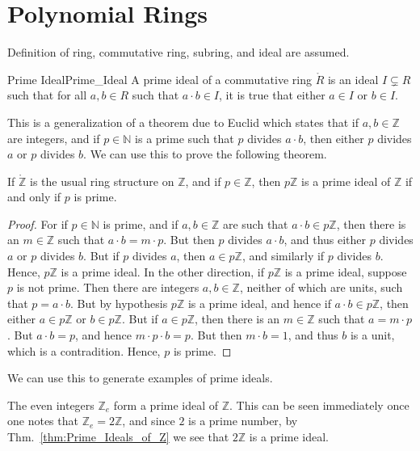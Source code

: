 \section{Polynomial Rings}
    Definition of ring, commutative ring, subring, and ideal are assumed.
    \begin{fdefinition}{Prime Ideal}{Prime_Ideal}
        A prime ideal of a commutative ring $\ring{R}$ is an ideal
        $I\subsetneq{R}$ such that for all $a,b\in{R}$ such that
        $a\cdot{b}\in{I}$, it is true that either $a\in{I}$ or $b\in{I}$.
    \end{fdefinition}
    This is a generalization of a theorem due to Euclid which states that if
    $a,b\in\mathbb{Z}$ are integers, and if $p\in\mathbb{N}$ is a prime such
    that $p$ divides $a\cdot{b}$, then either $p$ divides $a$ or $p$ divides
    $b$. We can use this to prove the following theorem.
    \begin{theorem}
        \label{thm:Prime_Ideals_of_Z}%
        If $\ring{\mathbb{Z}}$ is the usual ring structure on $\mathbb{Z}$,
        and if $p\in\mathbb{Z}$, then $p\mathbb{Z}$ is a prime ideal of
        $\mathbb{Z}$ if and only if $p$ is prime.
    \end{theorem}
    \begin{proof}
        For if $p\in\mathbb{N}$ is prime, and if $a,b\in\mathbb{Z}$ are such
        that $a\cdot{b}\in{p}\mathbb{Z}$, then there is an $m\in\mathbb{Z}$
        such that $a\cdot{b}=m\cdot{p}$. But then $p$ divides $a\cdot{b}$,
        and thus either $p$ divides $a$ or $p$ divides $b$. But if $p$
        divides $a$, then $a\in{p}\mathbb{Z}$, and similarly if $p$ divides
        $b$. Hence, $p\mathbb{Z}$ is a prime ideal. In the other direction,
        if $p\mathbb{Z}$ is a prime ideal, suppose $p$ is not prime. Then
        there are integers $a,b\in\mathbb{Z}$, neither of which are units,
        such that $p=a\cdot{b}$. But by hypothesis $p\mathbb{Z}$ is a prime
        ideal, and hence if $a\cdot{b}\in{p}\mathbb{Z}$, then either
        $a\in{p}\mathbb{Z}$ or $b\in{p}\mathbb{Z}$. But if
        $a\in{p}\mathbb{Z}$, then there is an $m\in\mathbb{Z}$ such that
        $a=m\cdot{p}$. But $a\cdot{b}=p$, and hence $m\cdot{p}\cdot{b}=p$.
        But then $m\cdot{b}=1$, and thus $b$ is a unit, which is a
        contradition. Hence, $p$ is prime.
    \end{proof}
    We can use this to generate examples of prime ideals.
    \begin{example}
        The even integers $\mathbb{Z}_{e}$ form a prime ideal of
        $\mathbb{Z}$. This can be seen immediately once one notes that
        $\mathbb{Z}_{e}=2\mathbb{Z}$, and since $2$ is a prime number,
        by Thm.~\ref{thm:Prime_Ideals_of_Z} we see that $2\mathbb{Z}$ is a
        prime ideal.
    \end{example}
